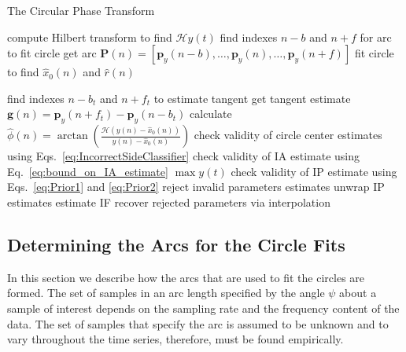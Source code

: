 \documentclass[a4paper]{IEEEtran}
\begin{document}
\begin{algorithm}
\caption{The Circular Phase Transform}\label{CPTAlgorithm}
\begin{algorithmic}[1]
\State compute Hilbert transform to find $\mathcal{H}y(t)$
	\State find indexes $n-b$ and $n+f$ for arc to fit circle
	\State get arc $\mathbf{P}(n) = [\mathbf{p}_y(n-b),\hdots, \mathbf{p}_y(n),\hdots,\mathbf{p}_y(n+f)]$
	\State fit circle to find $\hat{x}_0(n)$ and $\hat{r}(n)$

	\State find indexes $n-b_t$ and $n+f_t$ to estimate tangent 
	\State get tangent estimate $\mathbf{g}(n)= \mathbf{p}_y(n + f_t) - \mathbf{p}_y(n - b_t)$
\EndFor
\State calculate $\hat\phi(n) = \arctan\left(\frac{\mathcal{H}(y(n) - \hat{x}_0(n))}{y(n) - \hat{x}_0(n)}\right)$
\State check validity of circle center estimates using Eqs.~\ref{eq:IncorrectSideClassifier}
\State check validity of IA estimate using Eq.~\ref{eq:bound_on_IA_estimate} $\max y(t)$
\State check validity of IP estimate using Eqs.~\ref{eq:Prior1} and \ref{eq:Prior2}
\State reject invalid parameters estimates
\State unwrap IP estimates
\State estimate IF
\State recover rejected parameters via interpolation 
\end{algorithmic}
\end{algorithm}

\subsection{Determining the Arcs for the Circle Fits}\label{sect:FindingArc}
In this section we describe how the arcs that are used to fit the circles are formed. The set of samples in an arc length specified by the angle $\psi$ about a sample of interest depends on the sampling rate and the frequency content of the data. The set of samples that specify the arc is assumed to be unknown and to vary throughout the time series, therefore, must be found empirically.
\end{document}
